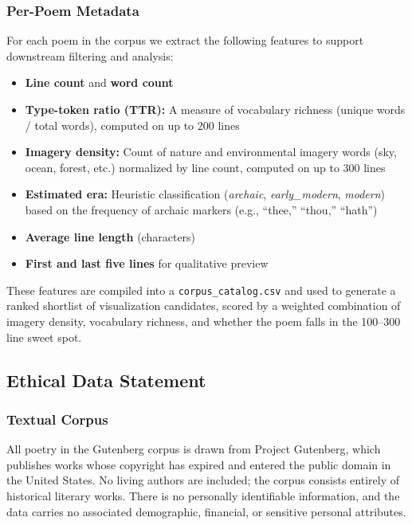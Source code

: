 \documentclass[11pt,a4paper]{article}
\begin{document}
\subsubsection*{Per-Poem Metadata}
For each poem in the corpus we extract the following features to support downstream filtering and analysis:
\begin{itemize}
  \item \textbf{Line count} and \textbf{word count}
  \item \textbf{Type-token ratio (TTR):} A measure of vocabulary richness (unique words / total words), computed on up to 200 lines
  \item \textbf{Imagery density:} Count of nature and environmental imagery words (sky, ocean, forest, etc.) normalized by line count, computed on up to 300 lines
  \item \textbf{Estimated era:} Heuristic classification (\textit{archaic}, \textit{early\_modern}, \textit{modern}) based on the frequency of archaic markers (e.g., ``thee,'' ``thou,'' ``hath'')
  \item \textbf{Average line length} (characters)
  \item \textbf{First and last five lines} for qualitative preview
\end{itemize}

These features are compiled into a \texttt{corpus\_catalog.csv} and used to generate a ranked shortlist of visualization candidates, scored by a weighted combination of imagery density, vocabulary richness, and whether the poem falls in the 100--300 line sweet spot.

\subsection*{Ethical Data Statement}

\subsubsection*{Textual Corpus}
All poetry in the Gutenberg corpus is drawn from Project Gutenberg, which publishes works whose copyright has expired and entered the public domain in the United States. No living authors are included; the corpus consists entirely of historical literary works. There is no personally identifiable information, and the data carries no associated demographic, financial, or sensitive personal attributes.
\end{document}
